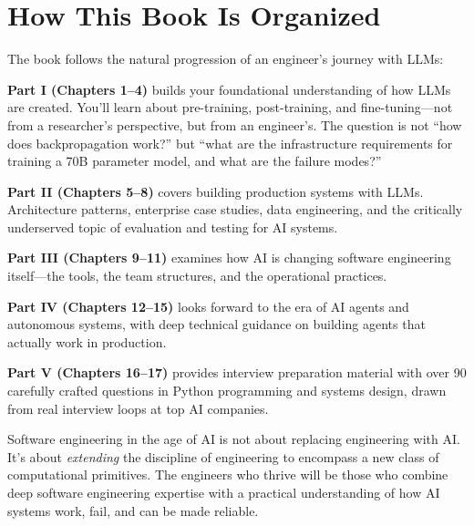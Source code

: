 \section{How This Book Is Organized}

The book follows the natural progression of an engineer's journey with LLMs:

\textbf{Part I (Chapters 1--4)} builds your foundational understanding of how LLMs are created. You'll learn about pre-training, post-training, and fine-tuning---not from a researcher's perspective, but from an engineer's. The question is not ``how does backpropagation work?'' but ``what are the infrastructure requirements for training a 70B parameter model, and what are the failure modes?''

\textbf{Part II (Chapters 5--8)} covers building production systems with LLMs. Architecture patterns, enterprise case studies, data engineering, and the critically underserved topic of evaluation and testing for AI systems.

\textbf{Part III (Chapters 9--11)} examines how AI is changing software engineering itself---the tools, the team structures, and the operational practices.

\textbf{Part IV (Chapters 12--15)} looks forward to the era of AI agents and autonomous systems, with deep technical guidance on building agents that actually work in production.

\textbf{Part V (Chapters 16--17)} provides interview preparation material with over 90 carefully crafted questions in Python programming and systems design, drawn from real interview loops at top AI companies.

\begin{keytakeaway}
Software engineering in the age of AI is not about replacing engineering with AI. It's about \emph{extending} the discipline of engineering to encompass a new class of computational primitives. The engineers who thrive will be those who combine deep software engineering expertise with a practical understanding of how AI systems work, fail, and can be made reliable.
\end{keytakeaway}
